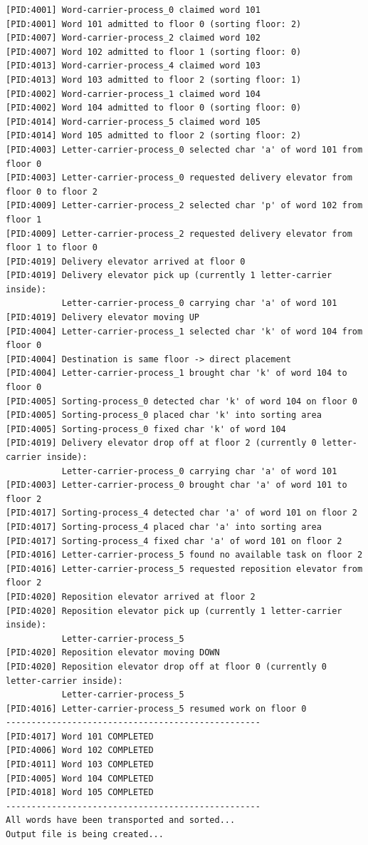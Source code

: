 \documentclass[12pt,a4paper]{article}
\begin{document}
\begin{lstlisting}[language={},numbers=none,caption={Word admission and character transport phase.}]
[PID:4001] Word-carrier-process_0 claimed word 101
[PID:4001] Word 101 admitted to floor 0 (sorting floor: 2)
[PID:4007] Word-carrier-process_2 claimed word 102
[PID:4007] Word 102 admitted to floor 1 (sorting floor: 0)
[PID:4013] Word-carrier-process_4 claimed word 103
[PID:4013] Word 103 admitted to floor 2 (sorting floor: 1)
[PID:4002] Word-carrier-process_1 claimed word 104
[PID:4002] Word 104 admitted to floor 0 (sorting floor: 0)
[PID:4014] Word-carrier-process_5 claimed word 105
[PID:4014] Word 105 admitted to floor 2 (sorting floor: 2)
[PID:4003] Letter-carrier-process_0 selected char 'a' of word 101 from floor 0
[PID:4003] Letter-carrier-process_0 requested delivery elevator from floor 0 to floor 2
[PID:4009] Letter-carrier-process_2 selected char 'p' of word 102 from floor 1
[PID:4009] Letter-carrier-process_2 requested delivery elevator from floor 1 to floor 0
[PID:4019] Delivery elevator arrived at floor 0
[PID:4019] Delivery elevator pick up (currently 1 letter-carrier inside):
           Letter-carrier-process_0 carrying char 'a' of word 101
[PID:4019] Delivery elevator moving UP
[PID:4004] Letter-carrier-process_1 selected char 'k' of word 104 from floor 0
[PID:4004] Destination is same floor -> direct placement
[PID:4004] Letter-carrier-process_1 brought char 'k' of word 104 to floor 0
[PID:4005] Sorting-process_0 detected char 'k' of word 104 on floor 0
[PID:4005] Sorting-process_0 placed char 'k' into sorting area
[PID:4005] Sorting-process_0 fixed char 'k' of word 104
[PID:4019] Delivery elevator drop off at floor 2 (currently 0 letter-carrier inside):
           Letter-carrier-process_0 carrying char 'a' of word 101
[PID:4003] Letter-carrier-process_0 brought char 'a' of word 101 to floor 2
[PID:4017] Sorting-process_4 detected char 'a' of word 101 on floor 2
[PID:4017] Sorting-process_4 placed char 'a' into sorting area
[PID:4017] Sorting-process_4 fixed char 'a' of word 101 on floor 2
[PID:4016] Letter-carrier-process_5 found no available task on floor 2
[PID:4016] Letter-carrier-process_5 requested reposition elevator from floor 2
[PID:4020] Reposition elevator arrived at floor 2
[PID:4020] Reposition elevator pick up (currently 1 letter-carrier inside):
           Letter-carrier-process_5
[PID:4020] Reposition elevator moving DOWN
[PID:4020] Reposition elevator drop off at floor 0 (currently 0 letter-carrier inside):
           Letter-carrier-process_5
[PID:4016] Letter-carrier-process_5 resumed work on floor 0
--------------------------------------------------
[PID:4017] Word 101 COMPLETED
[PID:4006] Word 102 COMPLETED
[PID:4011] Word 103 COMPLETED
[PID:4005] Word 104 COMPLETED
[PID:4018] Word 105 COMPLETED
--------------------------------------------------
All words have been transported and sorted...
Output file is being created...
\end{lstlisting}
\end{document}
